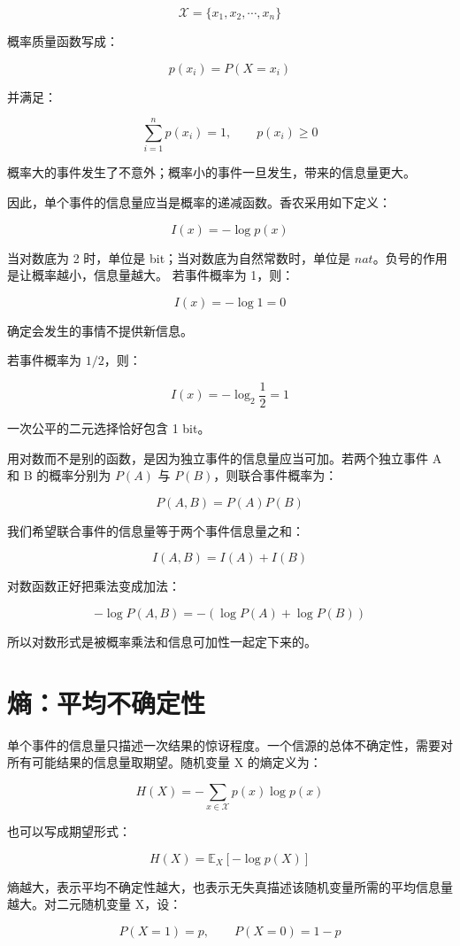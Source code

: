 \[
\mathcal{X}=\{x_1,x_2,\cdots,x_n\}
\]

概率质量函数写成：

\[
p(x_i)=P(X=x_i)
\]

并满足：

\[
\sum_{i=1}^{n}p(x_i)=1,\qquad p(x_i)\ge 0
\]

概率大的事件发生了不意外；概率小的事件一旦发生，带来的信息量更大。

因此，单个事件的信息量应当是概率的递减函数。香农采用如下定义：

\[
I(x)=-\log p(x)
\]

当对数底为 2 时，单位是 bit；当对数底为自然常数时，单位是 \(nat\)。负号的作用是让概率越小，信息量越大。
若事件概率为 1，则：

\[
I(x)=-\log 1=0
\]

确定会发生的事情不提供新信息。

若事件概率为 \(1/2\)，则：

\[
I(x)=-\log_2 \frac{1}{2}=1
\]

一次公平的二元选择恰好包含 1 bit。

用对数而不是别的函数，是因为独立事件的信息量应当可加。若两个独立事件 A 和 B 的概率分别为 \(P(A)\) 与 \(P(B)\)，则联合事件概率为：

\[
P(A,B)=P(A)P(B)
\]

我们希望联合事件的信息量等于两个事件信息量之和：

\[
I(A,B)=I(A)+I(B)
\]

对数函数正好把乘法变成加法：

\[
-\log P(A,B)=-\left (\log P(A)+\log P(B)\right)
\]

所以对数形式是被概率乘法和信息可加性一起定下来的。

\section{熵：平均不确定性}

单个事件的信息量只描述一次结果的惊讶程度。一个信源的总体不确定性，需要对所有可能结果的信息量取期望。随机变量 X 的熵定义为：

\[
H(X)=-\sum_{x\in\mathcal{X}}p(x)\log p(x)
\]

也可以写成期望形式：

\[
H(X)=\mathbb{E}_{X}[-\log p(X)]
\]

熵越大，表示平均不确定性越大，也表示无失真描述该随机变量所需的平均信息量越大。对二元随机变量 X，设：

\[
P(X=1)=p,\qquad P(X=0)=1-p
\]

